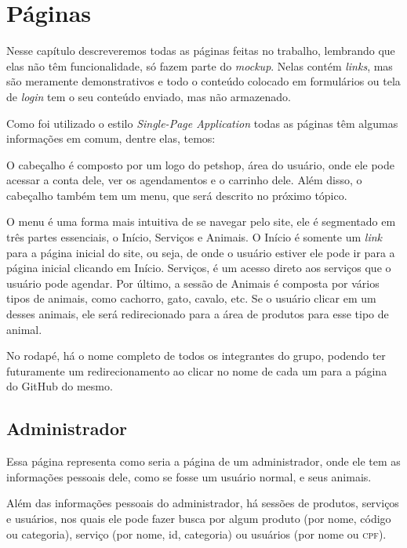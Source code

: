 \chapter{Páginas}
Nesse capítulo descreveremos todas as páginas feitas no trabalho, lembrando
que elas não têm funcionalidade, só fazem parte do \emph{mockup}. Nelas contém
\emph{links}, mas são meramente demonstrativos e todo o conteúdo colocado em
formulários ou tela de \emph{login} tem o seu conteúdo enviado, mas não
armazenado.

Como foi utilizado o estilo \emph{Single-Page Application} todas as páginas têm
algumas informações em comum, dentre elas, temos:
\begin{description}[style=nextline]
	\item [Cabeçalho]	O cabeçalho é composto por um logo do petshop, área do
						usuário, onde ele pode acessar a conta dele, ver os
						agendamentos e o carrinho dele. Além disso, o cabeçalho
						também tem um menu, que será descrito no próximo tópico.
	\item [Menu]		O menu é uma forma mais intuitiva de se navegar pelo site,
						ele é segmentado em três partes essenciais, o Início,
						Serviços e Animais. O Início é somente um \emph{link} para
						a página inicial do site, ou seja, de onde o usuário estiver
						ele pode ir para a página inicial clicando em Início.
						Serviços, é um acesso direto aos serviços que o usuário pode
						agendar. Por último, a sessão de Animais é composta por
						vários tipos de animais, como cachorro, gato, cavalo, etc.
						Se o usuário clicar em um desses animais, ele será
						redirecionado para a área de produtos para esse tipo de animal.
	\item [Rodapé]		No rodapé, há o nome completo de todos os integrantes do grupo,
						podendo ter futuramente um redirecionamento ao clicar no nome
						de cada um para a página do	GitHub do mesmo.
\end{description}

\section{Administrador}
Essa página representa como seria a página de um administrador, onde ele tem
as informações pessoais dele, como se fosse um usuário normal, e seus animais.

Além das informações pessoais do administrador, há sessões de produtos,
serviços e usuários, nos quais ele pode fazer busca por algum produto (por nome,
código ou categoria), serviço (por nome, id, categoria) ou usuários (por nome ou
\textsc{cpf}).

